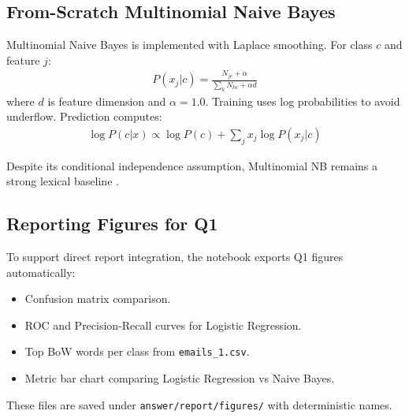 \subsection{From-Scratch Multinomial Naive Bayes}

Multinomial Naive Bayes is implemented with Laplace smoothing. For class $c$ and feature $j$:
\begin{align}
P(x_j|c) = \frac{N_{jc}+\alpha}{\sum_k N_{kc}+\alpha d}
\end{align}
where $d$ is feature dimension and $\alpha=1.0$. Training uses log probabilities to avoid underflow. Prediction computes:
\begin{align}
\log P(c|x) \propto \log P(c) + \sum_j x_j \log P(x_j|c)
\end{align}

Despite its conditional independence assumption, Multinomial NB remains a strong lexical baseline \cite{mccallum1998comparison}.

\subsection{Reporting Figures for Q1}

To support direct report integration, the notebook exports Q1 figures automatically:
\begin{itemize}
    \item Confusion matrix comparison.
    \item ROC and Precision-Recall curves for Logistic Regression.
    \item Top BoW words per class from \texttt{emails\_1.csv}.
    \item Metric bar chart comparing Logistic Regression vs Naive Bayes.
\end{itemize}

These files are saved under \texttt{answer/report/figures/} with deterministic names.
